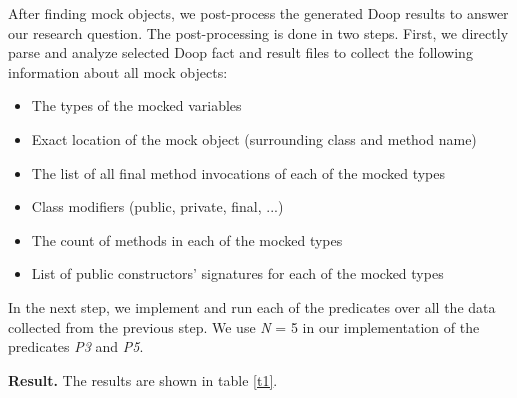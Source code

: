 \documentclass[conference]{IEEEtran}
\begin{document}
After finding mock objects, we post-process the generated Doop results to answer our research question. The post-processing is done in two steps. First, we directly parse and analyze selected Doop fact and result files to collect the following information about all mock objects: 
\begin{itemize}
    \item The types of the mocked variables
    \item Exact location of the mock object (surrounding class and method name)
    \item The list of all final method invocations of each of the mocked types
    \item Class modifiers (public, private, final, ...)
    \item The count of methods in each of the mocked types
    \item List of public constructors' signatures for each of the mocked types 
\end{itemize}

In the next step, we implement and run each of the predicates over all the data collected from the previous step. We use \textit{N} = 5 in our implementation of the predicates \textit{P3} and \textit{P5}.

\textbf{Result.}
The results are shown in table \ref{t1}.
\end{document}
